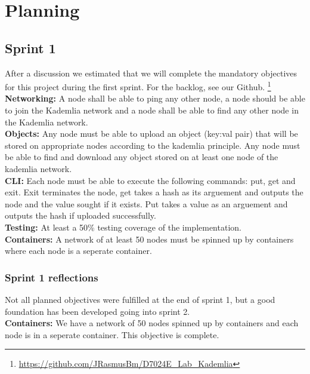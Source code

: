 \section{Planning}\label{sec:planning}

\subsection{Sprint 1}\label{sec:sprint-1}
After a discussion we estimated that we will complete the mandatory objectives
for this project during the first sprint. For the backlog, see our Github.
\footnote{\href{https://github.com/JRasmusBm/D7024E_Lab_Kademlia}{https://github.com/JRasmusBm/D7024E\_Lab\_Kademlia}}\\

\textbf{Networking:} A node shall be able to ping any other node,
a node should be able to join the Kademlia network and a node shall
be able to find any other node in the Kademlia network.\\

\textbf{Objects:} Any node must be able to upload an object
(key:val pair) that will be stored on appropriate nodes according
to the kademlia principle. Any node must be able to find and
download any object stored on at least one node of the kademlia network.\\

\textbf{CLI:} Each node must be able to execute the following
commands: put, get and exit. Exit terminates the node, get
takes a hash as its arguement and outputs the node and the value
sought if it exists. Put takes a value as an arguement and
outputs the hash if uploaded successfully.\\

\textbf{Testing:} At least a 50\% testing coverage of the implementation.\\

\textbf{Containers:} A network of at least 50 nodes must be spinned
up by containers where each node is a seperate container.

\subsubsection{Sprint 1 reflections}\label{sec:sprint-1-reflections}
Not all planned objectives were fulfilled at the end of sprint 1,
but a good foundation has been developed going into sprint 2.\\

\textbf{Containers:} We have a network of 50 nodes spinned up by
containers and each node is in a seperate container. This objective
is complete.\\

